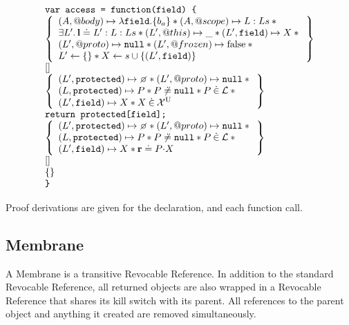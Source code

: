 \documentclass[a4paper]{article}
\begin{document}
\[
  \begin{array}{l}
    \js{var access = function(field) \{} \\
    \logic{
      (A, @body) \mapsto \lambda \js{field}.\{b_a\} \sep (A, @scope) \mapsto L:Ls \sep {} \\
      \exists L' \st \ls \doteq L' : L : Ls \sep (L',@this) \mapsto \_ \sep
      (L', \js{field}) \mapsto X \sep {} \\
      (L',@proto) \mapsto \nil \sep (L',@frozen) \mapsto \false \sep {} \\
      L' \bp \{\} \sep X \bp s \cup \{(L', \js{field})\}
    } \\
    \step{} \\
    \logic{
      (L',\js{protected}) \mapsto \none \sep (L',@proto) \mapsto \nil \sep {} \\
      (L, \js{protected}) \mapsto P \sep
      P \not\doteq \nil \sep P \dotin \loc \sep {} \\
      (L',\js{field}) \mapsto X \sep X \dotin \uvars
    } \\
    \js{return protected[field];} \\
    \logic{
      (L',\js{protected}) \mapsto \none \sep (L',@proto) \mapsto \nil \sep {} \\
      (L, \js{protected}) \mapsto P \sep
      P \not\doteq \nil \sep P \dotin \loc \sep {} \\
      (L',\js{field}) \mapsto X \sep \rv \doteq \fld{P}{X}
    } \\
    \step{} \\
    \logic{

    } \\
    \js{\}}
  \end{array}
\]


Proof derivations are given for the declaration, and each function call.

\subsection{Membrane}
A Membrane is a transitive Revocable Reference. In addition to the standard
Revocable Reference, all returned objects are also wrapped in a Revocable
Reference that shares its kill switch with its parent. All references to the
parent object and anything it created are removed simultaneously.
\end{document}
